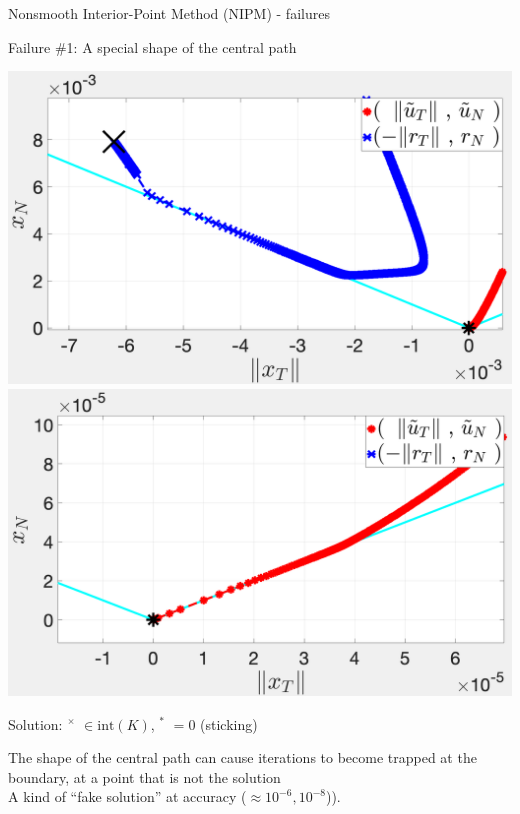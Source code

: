 \begin{frame}{Nonsmooth Interior-Point Method (NIPM) - failures}
    \vspace{-0.1cm}
    \begin{exampleblock}{Failure \#1: {\color{black} A special shape of the central path}}
        \begin{center}
            \includegraphics[width=0.495\linewidth]{./figure/IPM/images/ncv_fail1a.png}
            \includegraphics[width=0.495\linewidth]{./figure/IPM/images/ncv_fail1b.png}
        \end{center}
        \begin{center}
        Solution: $^\times${\color{blue} $\in \mbox{int}({K})$}, $^*${\color{red} $= 0$} \quad (sticking)
        \end{center}
    \end{exampleblock}
    The shape of the central path can cause iterations to become trapped  at the boundary, at a point that is not the solution\\
    A kind of ``fake solution'' at accuracy ($\approx 10^{-6}, 10^{-8}$)).
\end{frame}




